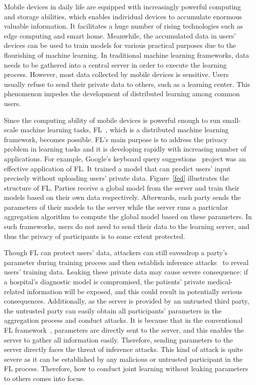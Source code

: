 Mobile devices in daily life are equipped with increasingly powerful computing and storage abilities, which enables individual devices to accumulate enormous valuable information. It facilitates a huge number of rising technologies such as edge computing and smart home. Meanwhile, the accumulated data in users' devices can be used to train models for various practical purposes due to the flourishing of machine learning. In traditional machine learning frameworks, data needs to be gathered into a central server in order to execute the learning process. However, most data collected by mobile devices is sensitive. Users usually refuse to send their private data to others, such as a learning center. This phenomenon impedes the development of distributed learning among common users.

Since the computing ability of mobile devices is powerful enough to run small-scale machine learning tasks, FL~\cite{mcmahan2016communicationefficient}, which is a distributed machine learning framework, becomes possible. FL's main purpose is to address the privacy problem in learning tasks and it is developing rapidly with increasing number of applications. For example, Google's keyboard query suggestions~\cite{yang2018applied} project was an effective application of FL. It trained a model that can predict users' input precisely without uploading users' private data. Figure~\ref{fed} illustrates the structure of FL. Parties receive a global model from the server and train their models based on their own data respectively. Afterwards, each party sends the parameters of their models to the server while the server runs a particular aggregation algorithm to compute the global model based on these parameters. In such frameworks, users do not need to send their data to the learning server, and thus the privacy of participants is to some extent protected.

Though FL can protect users' data, attackers can still eavesdrop a party's parameter during training process and then establish inference attacks~\cite{Beyond, Leakage, Nasr19} to reveal users' training data. Leaking these private data may cause severe consequence: if a hospital's diagnostic model is compromised, the patients' private medical-related information will be exposed, and this could result in potentially serious consequences. Additionally, as the server is provided by an untrusted third party, the untrusted party can easily obtain all participants' parameters in the aggregation process and conduct attacks. It is because that in the conventional FL framework~\cite{Nasr19}, parameters are directly sent to the server, and this enables the server to gather all information easily. Therefore, sending parameters to the server directly faces the threat of inference attacks. This kind of attack is quite severe as it can be established by any malicious or untrusted participant in the FL process. Therefore, how to conduct joint learning without leaking parameters to others comes into focus.

